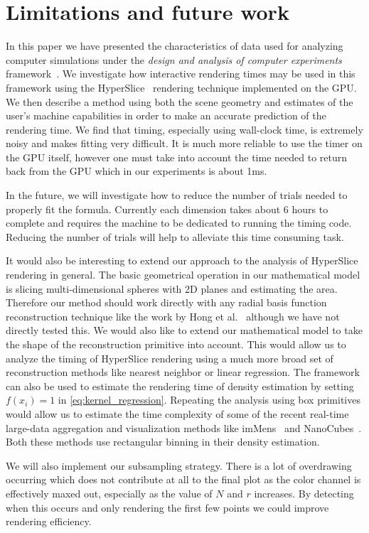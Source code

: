 \section{Limitations and future work}
\label{sec:conclusion}

In this paper we have presented the characteristics of data used for
analyzing computer simulations under the 
\emph{design and analysis of computer experiments} 
framework~\cite{Santner:2003}.  We investigate
how interactive rendering times may be used in this framework using the
HyperSlice~\cite{Wijk:1993} rendering technique implemented on the GPU.
We then describe a method using both the scene geometry and estimates of the
user's machine capabilities in order to make an accurate prediction of 
the rendering time.
We find that timing, especially using wall-clock time, is extremely noisy
and makes fitting very difficult.  It is much more reliable to use the
timer on the GPU itself, however one must take into account the time needed
to return back from the GPU which in our experiments is about 1ms.

In the future, we will investigate how to reduce the number of trials
needed to properly fit the formula.  Currently each dimension
takes about 6 hours to complete and requires the machine to be dedicated
to running the timing code.  Reducing the number of trials will help to
alleviate this time consuming task.

It would also be interesting to extend our approach to the analysis of
HyperSlice rendering in general. The basic geometrical operation in our
mathematical model is slicing multi-dimensional spheres with 2D planes and
estimating the area. Therefore our method should work directly with any radial
basis function reconstruction technique like the work by Hong et
al.~\cite{Hong:2006} although we have not directly tested this.  We would also
like to extend our mathematical model to take the shape of the reconstruction
primitive into account. This would allow us to analyze the timing of HyperSlice
rendering using a much more broad set of reconstruction methods like 
nearest neighbor or linear regression. 
The framework can also be used to estimate the rendering time of density
estimation by setting $f(x_i) = 1$ in \autoref{eq:kernel_regression}. Repeating the
analysis using box primitives would allow us to estimate the time complexity
of some of the recent real-time large-data aggregation and visualization 
methods like imMens~\cite{Liu:2013} and NanoCubes~\cite{Lins:2013}. Both these
methods use rectangular binning in their density estimation.

We will also implement our subsampling strategy.
There is a lot of overdrawing occurring which does not contribute at
all to the final plot as the color channel is effectively maxed out, 
especially as the value of $N$ and $r$ increases.  By detecting when this 
occurs and only rendering the first few points we could improve rendering
efficiency.


